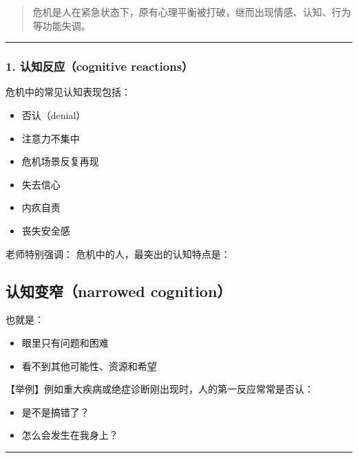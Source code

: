 \documentclass[
  chinese,
  9pt,
  a4paper,
]{ctexart}
\providecommand{\tightlist}{%
  \setlength{\itemsep}{0pt}\setlength{\parskip}{0pt}}
\begin{document}
\begin{quote}
危机是人在紧急状态下，原有心理平衡被打破，继而出现情感、认知、行为等功能失调。
\end{quote}

\begin{center}\rule{0.5\linewidth}{0.5pt}\end{center}

\subsubsection{1. 认知反应（cognitive
reactions）}\label{ux8ba4ux77e5ux53cdux5e94cognitive-reactions}

危机中的常见认知表现包括：

\begin{itemize}
\tightlist
\item
  否认（denial）
\item
  注意力不集中
\item
  危机场景反复再现
\item
  失去信心
\item
  内疚自责
\item
  丧失安全感
\end{itemize}

老师特别强调： 危机中的人，最突出的认知特点是：

\subsection{\texorpdfstring{\textbf{认知变窄（narrowed
cognition）}}{认知变窄（narrowed cognition）}}\label{ux8ba4ux77e5ux53d8ux7a84narrowed-cognition}

也就是：

\begin{itemize}
\tightlist
\item
  眼里只有问题和困难
\item
  看不到其他可能性、资源和希望
\end{itemize}

【举例】例如重大疾病或绝症诊断刚出现时，人的第一反应常常是否认：

\begin{itemize}
\tightlist
\item
  是不是搞错了？
\item
  怎么会发生在我身上？
\end{itemize}

\begin{center}\rule{0.5\linewidth}{0.5pt}\end{center}
\end{document}
